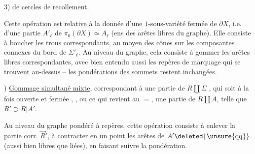 3)  de cercles de recollement.

Cette opération est relative à la donnée d'une $1$-sous-variété fermée de $\partial X$, i.e. d'une partie $A'_\ell$ de $\pi_0(\partial X)\simeq A_\ell$ (ens des arêtes libres du graphe). Elle consiste à boucher les trous correspondants, au moyen des cônes sur les composantes connexes du bord de $\Sigma'_\ell$. Au niveau du graphe, cela consiste à gommer les arêtes libres correspondantes, avec bien entendu aussi les repères de marquage qui se trouvent au-dessus --  les pondérations des sommets restent inchangées.

) \uline{Gommage simultané mixte},  correspondant à une partie  de $\underline{R\amalg\Sigma}$ , qui soit à la fois ouverte et fermée , , ou ce qui revient au $=$, une partie  de $R\amalg A$, telle que $R'\supset R|A'$.

Au niveau du graphe pondéré à repères, cette opération consiste à enlever  la partie corr. $\vec R'$, à contracter en un point les arêtes de $A'\deleted{\unsure{\mathrm{qq}}}$ (aussi bien libres que liées), en faisant suivre la pondération.
